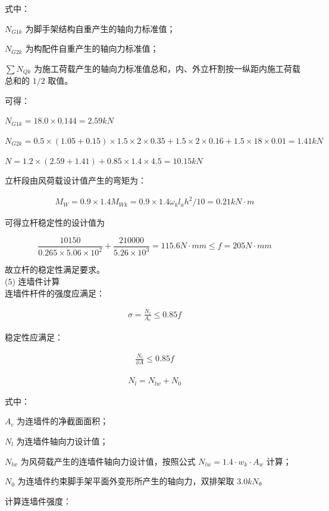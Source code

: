 式中：

$N_{G1k}$ 为脚手架结构自重产生的轴向力标准值； 

$N_{G2k}$ 为构配件自重产生的轴向力标准值；

$\sum N_{Qk}$ 为施工荷载产生的轴向力标准值总和，内、外立杆割按一纵距内施工荷载
总和的 $1/2$ 取值。

可得：

$N_{G1k}=18.0\times 0.144=2.59 kN$

$N_{G2k}=0.5\times (1.05+0.15)\times 1.5\times 2\times 0.35+1.5\times 2\times 0.16+1.5\times 18\times 0.01=1.41 kN$

$N=1.2\times (2.59+1.41)+0.85\times 1.4\times 4.5=10.15 kN$

立杆段由风荷载设计值产生的弯矩为：

\begin{align}
    M_W=0.9\times 1.4M_{Wk}=0.9\times 1.4\omega _kl_ah^2/10=0.21kN\cdot m
\end{align}

可得立杆稳定性的设计值为

$$\frac{10150}{0.265×5.06×10^2}+\frac{210000}{5.26×10^3}=115.6 N\cdot mm \leq f=205 N\cdot mm$$

故立杆的稳定性满足要求。\\

(5) 连墙件计算\\

连墙件杆件的强度应满足：

\begin{align}
    \sigma =\frac{N_l}{A_c}\leq 0.85f
\end{align}

稳定性应满足：

\begin{align}
    \label{fx:stb}    
    \frac{N_l}{\phi A}\leq 0.85f
\end{align}

\begin{align}
    N_l=N_{lw}+N_0
\end{align}

式中：

$A_c$ 为连墙件的净截面面积；  

$N_l$ 为连墙件轴向力设计值；   

$N_{lw}$ 为风荷载产生的连墙件轴向力设计值，按照公式 $N_{lw}=1.4\cdot w_k\cdot A_w$ 计算；

$N_0$ 为连墙件约束脚手架平面外变形所产生的轴向力，双排架取 $3.0kN$。

计算连墙件强度： 

